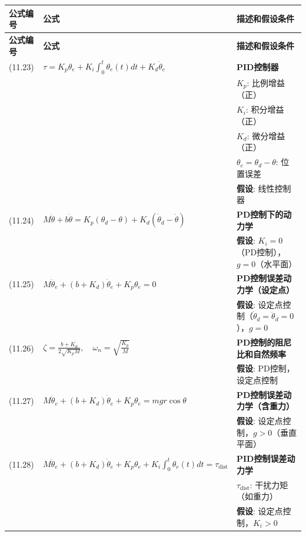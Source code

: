 \documentclass[12pt,a4paper]{article}
\begin{document}
\begin{longtable}{|p{}|p{}|p{}|}
\hline
\textbf{公式编号} & \textbf{公式} & \textbf{描述和假设条件} \\
\hline
\endfirsthead
\hline
\textbf{公式编号} & \textbf{公式} & \textbf{描述和假设条件} \\
\hline
\endhead
\hline
\endfoot
\hline
\endlastfoot

(11.23) & $\tau = K_p\theta_e + K_i\int_0^t\theta_e(t)dt + K_d\dot{\theta}_e$ & 
\textbf{PID控制器} \\
& & $K_p$: 比例增益（正） \\
& & $K_i$: 积分增益（正） \\
& & $K_d$: 微分增益（正） \\
& & $\theta_e = \theta_d - \theta$: 位置误差 \\
& & \textbf{假设}: 线性控制器 \\
\hline

(11.24) & $M\ddot{\theta} + b\dot{\theta} = K_p(\theta_d - \theta) + K_d(\dot{\theta}_d - \dot{\theta})$ & 
\textbf{PD控制下的动力学} \\
& & \textbf{假设}: $K_i = 0$（PD控制），$g = 0$（水平面） \\
\hline

(11.25) & $M\ddot{\theta}_e + (b + K_d)\dot{\theta}_e + K_p\theta_e = 0$ & 
\textbf{PD控制误差动力学（设定点）} \\
& & \textbf{假设}: 设定点控制（$\dot{\theta}_d = \ddot{\theta}_d = 0$），$g = 0$ \\
\hline

(11.26) & $\zeta = \frac{b + K_d}{2\sqrt{K_p M}}, \quad \omega_n = \sqrt{\frac{K_p}{M}}$ & 
\textbf{PD控制的阻尼比和自然频率} \\
& & \textbf{假设}: PD控制，设定点控制 \\
\hline

(11.27) & $M\ddot{\theta}_e + (b + K_d)\dot{\theta}_e + K_p\theta_e = mgr\cos\theta$ & 
\textbf{PD控制误差动力学（含重力）} \\
& & \textbf{假设}: 设定点控制，$g > 0$（垂直平面） \\
\hline

(11.28) & $M\ddot{\theta}_e + (b + K_d)\dot{\theta}_e + K_p\theta_e + K_i\int_0^t\theta_e(t)dt = \tau_{\text{dist}}$ & 
\textbf{PID控制误差动力学} \\
& & $\tau_{\text{dist}}$: 干扰力矩（如重力） \\
& & \textbf{假设}: 设定点控制，$K_i > 0$ \\
\hline


\end{longtable}
\end{document}
